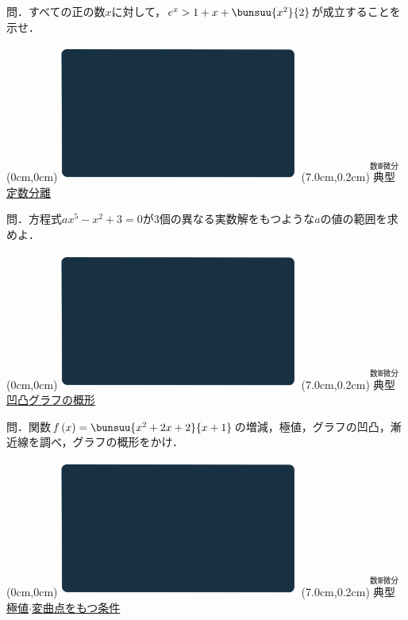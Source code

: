 \documentclass[10pt,
fleqn,
dvipdfmx,
uplatex
]{jsarticle}
\begin{document}
\LARGE 
問．すべての正の数$x$に対して，$e^x>1+x+\bunsuu{{x^2}}{2}$が成立することを示せ．


\newpage



\at(0cm,0cm){\includegraphics[width=8cm,bb=0 0 1920 1080]{./youtube/thumbnails/templates/smart_background/数III微分.jpeg}}
\at(7.0cm,0.2cm){\small\color{bradorange}$\overset{\text{数Ⅲ微分}}{\text{典型}}$}
{\color{orange}\huge\underline{定数分離}}\vspace{0.3zw}

\LARGE 
問．方程式$ax^5-x^2+3=0$が$3$個の異なる実数解をもつような$a$の値の範囲を求めよ．


\newpage



\at(0cm,0cm){\includegraphics[width=8cm,bb=0 0 1920 1080]{./youtube/thumbnails/templates/smart_background/数III微分.jpeg}}
\at(7.0cm,0.2cm){\small\color{bradorange}$\overset{\text{数Ⅲ微分}}{\text{典型}}$}
{\color{orange}\huge\underline{凹凸グラフの概形}}\vspace{0.3zw}

\Large 
問．関数$f\left(x\right)=\bunsuu{{x^2+2x+2}}{{x+1}}$の増減，極値，グラフの凹凸，漸近線を調べ，グラフの概形をかけ．


\newpage



\at(0cm,0cm){\includegraphics[width=8cm,bb=0 0 1920 1080]{./youtube/thumbnails/templates/smart_background/数III微分.jpeg}}
\at(7.0cm,0.2cm){\small\color{bradorange}$\overset{\text{数Ⅲ微分}}{\text{典型}}$}
{\color{orange}\LARGE\underline{極値$\cdot$変曲点をもつ条件}}\vspace{0.3zw}
\end{document}

